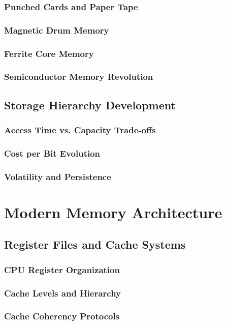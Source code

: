 \documentclass[12pt, oneside]{book}
\begin{document}
\subsubsection{Punched Cards and Paper Tape}
\subsubsection{Magnetic Drum Memory}
\subsubsection{Ferrite Core Memory}
\subsubsection{Semiconductor Memory Revolution}

\subsection{Storage Hierarchy Development}
\subsubsection{Access Time vs. Capacity Trade-offs}
\subsubsection{Cost per Bit Evolution}
\subsubsection{Volatility and Persistence}

\section{Modern Memory Architecture}
\subsection{Register Files and Cache Systems}
\subsubsection{CPU Register Organization}
\subsubsection{Cache Levels and Hierarchy}
\subsubsection{Cache Coherency Protocols}
\end{document}

